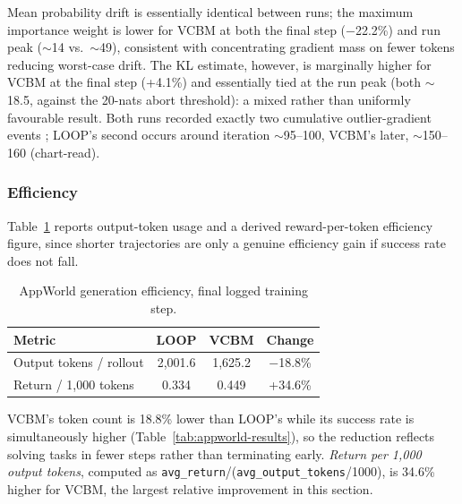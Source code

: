 \documentclass[conference]{IEEEtran}
\begin{document}
Mean probability drift is essentially identical between runs; the maximum importance weight is lower for VCBM at both the final step ($-$22.2\%) and run peak ($\sim$14 vs.\ $\sim$49), consistent with concentrating gradient mass on fewer tokens reducing worst-case drift. The KL estimate, however, is marginally higher for VCBM at the final step (+4.1\%) and essentially tied at the run peak (both $\sim$18.5, against the 20-nats abort threshold): a mixed rather than uniformly favourable result. Both runs recorded exactly two cumulative outlier-gradient events \cite{b_du2017saddlepoints,b_hardt2016trainfaster}; LOOP's second occurs around iteration $\sim$95--100, VCBM's later, $\sim$150--160 (chart-read).

\subsubsection{Efficiency}
Table~\ref{tab:appworld-efficiency} reports output-token usage and a derived reward-per-token efficiency figure, since shorter trajectories are only a genuine efficiency gain if success rate does not fall.

\begin{table}[htbp]
  \centering
  \caption{AppWorld generation efficiency, final logged training step.}
  \label{tab:appworld-efficiency}
  \begin{tabular}{@{}p{3.3cm}ccc@{}}
    \toprule
    \textbf{Metric} & \textbf{LOOP} & \textbf{VCBM} & \textbf{Change} \\
    \midrule
    Output tokens / rollout & 2{,}001.6 & 1{,}625.2 & $-$18.8\% \\
    Return / 1{,}000 tokens & 0.334     & 0.449     & +34.6\%   \\
    \bottomrule
  \end{tabular}
\end{table}

VCBM's token count is 18.8\% lower than LOOP's while its success rate is simultaneously higher (Table~\ref{tab:appworld-results}), so the reduction reflects solving tasks in fewer steps rather than terminating early. \emph{Return per 1{,}000 output tokens}, computed as \texttt{avg\_return}/(\texttt{avg\_output\_tokens}/1000), is 34.6\% higher for VCBM, the largest relative improvement in this section.
\end{document}

